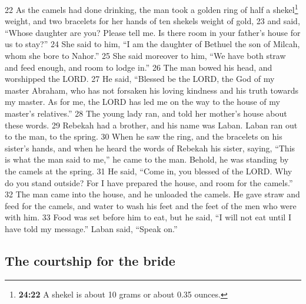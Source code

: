 {22} As the camels had done drinking, the man took a golden ring of half
a shekel\footnote{\textbf{24:22} A shekel is about 10 grams or about
  0.35 ounces.} weight, and two bracelets for her hands of ten shekels
weight of gold, {23} and said, ``Whose daughter are you? Please tell me.
Is there room in your father's house for us to stay?'' {24} She said to
him, ``I am the daughter of Bethuel the son of Milcah, whom she bore to
Nahor.'' {25} She said moreover to him, ``We have both straw and feed
enough, and room to lodge in.'' {26} The man bowed his head, and
worshipped the LORD. {27} He said, ``Blessed be the LORD, the God of my
master Abraham, who has not forsaken his loving kindness and his truth
towards my master. As for me, the LORD has led me on the way to the
house of my master's relatives.'' {28} The young lady ran, and told her
mother's house about these words. {29} Rebekah had a brother, and his
name was Laban. Laban ran out to the man, to the spring. {30} When he
saw the ring, and the bracelets on his sister's hands, and when he heard
the words of Rebekah his sister, saying, ``This is what the man said to
me,'' he came to the man. Behold, he was standing by the camels at the
spring. {31} He said, ``Come in, you blessed of the LORD. Why do you
stand outside? For I have prepared the house, and room for the camels.''
{32} The man came into the house, and he unloaded the camels. He gave
straw and feed for the camels, and water to wash his feet and the feet
of the men who were with him. {33} Food was set before him to eat, but
he said, ``I will not eat until I have told my message.'' Laban said,
``Speak on.''

\hypertarget{the-courtship-for-the-bride}{%
\subsection{The courtship for the
bride}\label{the-courtship-for-the-bride}}

